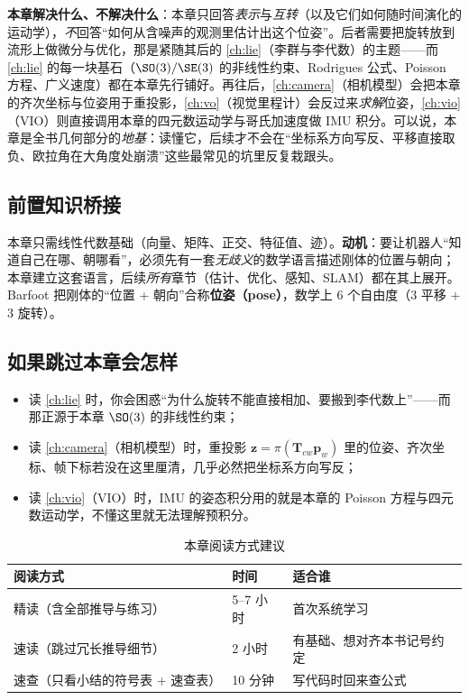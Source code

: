 \textbf{本章解决什么、不解决什么}：本章只回答\emph{表示}与\emph{互转}（以及它们如何随时间演化的运动学），\emph{不}回答“如何从含噪声的观测里估计出这个位姿”。后者需要把旋转放到流形上做微分与优化，那是紧随其后的 \cref{ch:lie}（李群与李代数）的主题——而 \cref{ch:lie} 的每一块基石（$\SO(3)/\SE(3)$ 的非线性约束、Rodrigues 公式、Poisson 方程、广义速度）都在本章先行铺好。再往后，\cref{ch:camera}（相机模型）会把本章的齐次坐标与位姿用于重投影，\cref{ch:vo}（视觉里程计）会反过来\emph{求解}位姿，\cref{ch:vio}（VIO）则直接调用本章的四元数运动学与哥氏加速度做 IMU 积分。可以说，本章是全书几何部分的\emph{地基}：读懂它，后续才不会在“坐标系方向写反、平移直接取负、欧拉角在大角度处崩溃”这些最常见的坑里反复栽跟头。

\subsection*{前置知识桥接}
本章只需线性代数基础（向量、矩阵、正交、特征值、迹）。\textbf{动机}：要让机器人“知道自己在哪、朝哪看”，必须先有一套\emph{无歧义}的数学语言描述刚体的位置与朝向；本章建立这套语言，后续\emph{所有}章节（估计、优化、感知、SLAM）都在其上展开。Barfoot\cite{barfoot2024state} 把刚体的“位置 + 朝向”合称\textbf{位姿（pose）}，数学上 $6$ 个自由度（$3$ 平移 $+$ $3$ 旋转）。

\subsection*{如果跳过本章会怎样}
\begin{itemize}
  \item 读 \cref{ch:lie} 时，你会困惑“为什么旋转不能直接相加、要搬到李代数上”——而那正源于本章 $\SO(3)$ 的非线性约束；
  \item 读 \cref{ch:camera}（相机模型）时，重投影 $\mathbf{z}=\pi(\mathbf{T}_{cw}\mathbf{p}_w)$ 里的位姿、齐次坐标、帧下标若没在这里厘清，几乎必然把坐标系方向写反；
  \item 读 \cref{ch:vio}（VIO）时，IMU 的姿态积分用的就是本章的 Poisson 方程与四元数运动学，不懂这里就无法理解预积分。
\end{itemize}

\begin{table}[H]\centering\small
\caption{本章阅读方式建议}
\begin{tabular}{lll}
\toprule
阅读方式 & 时间 & 适合谁 \\
\midrule
精读（含全部推导与练习） & 5--7 小时 & 首次系统学习 \\
速读（跳过冗长推导细节） & 2 小时 & 有基础、想对齐本书记号约定 \\
速查（只看小结的符号表 + 速查表） & 10 分钟 & 写代码时回来查公式 \\
\bottomrule
\end{tabular}
\end{table}

